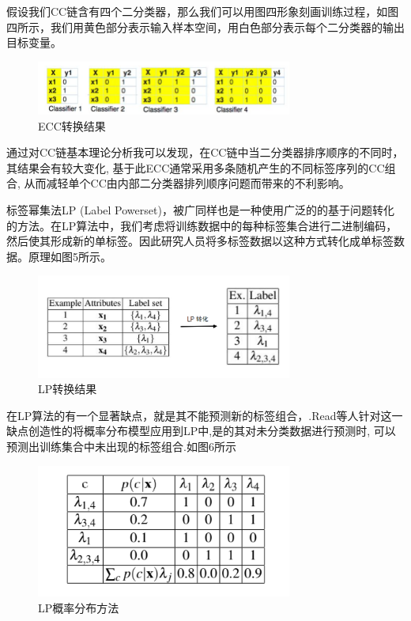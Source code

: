 假设我们CC链含有四个二分类器，那么我们可以用图四形象刻画训练过程，如图四所示，我们用黄色部分表示输入样本空间，用白色部分表示每个二分类器的输出目标变量。

\begin{figure}[htbp!]
	\centering
	\includegraphics[width=0.75\textwidth]{figures/p2-5.png}
	\caption{ECC转换结果}\label{fig:p2-5}
	\vspace{-1em}
\end{figure}

通过对CC链基本理论分析我可以发现，在CC链中当二分类器排序顺序的不同时，其结果会有较大变化, 基于此ECC通常采用多条随机产生的不同标签序列的CC组合, 从而减轻单个CC由内部二分类器排列顺序问题而带来的不利影响。

标签幂集法LP (Label Powerset)，被广同样也是一种使用广泛的的基于问题转化的方法。在LP算法中，我们考虑将训练数据中的每种标签集合进行二进制编码，然后使其形成新的单标签。因此研究人员将多标签数据以这种方式转化成单标签数据。原理如图5所示。

\begin{figure}[htbp!]
	\centering
	\includegraphics[width=0.75\textwidth]{figures/p2-6.png}
	\caption{LP转换结果}\label{fig:p2-6}
	\vspace{-1em}
\end{figure}

在LP算法的有一个显著缺点，就是其不能预测新的标签组合，.Read等人针对这一缺点创造性的将概率分布模型应用到LP中,是的其对未分类数据进行预测时, 可以预测出训练集合中未出现的标签组合\cite{Agrawal2013Multi}.如图6所示

\begin{figure}[htbp!]
	\centering
	\includegraphics[width=0.75\textwidth]{figures/p2-7.png}
	\caption{LP概率分布方法}\label{fig:p2-7}
	\vspace{-1em}
\end{figure}

